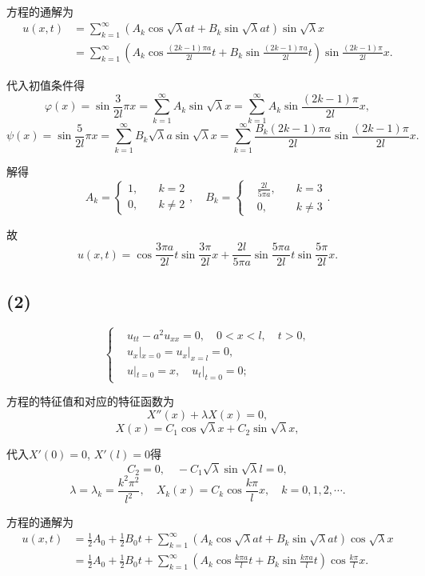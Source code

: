 \documentclass[11pt,a4paper]{article}
\begin{document}
方程的通解为
\begin{align*}
  u(x,t)
   & =\sum_{k=1}^\infty\left(A_k\cos\sqrt{\lambda}at+
  B_k\sin\sqrt{\lambda}at\right)\sin\sqrt{\lambda}x          \\
   & =\sum_{k=1}^\infty\left(A_k\cos\frac{(2k-1)\pi a}{2l}t+
  B_k\sin\frac{(2k-1)\pi a}{2l}t\right)\sin\frac{(2k-1)\pi}{2l}x.
\end{align*}

代入初值条件得
$$\varphi(x)=\sin\frac{3}{2l}\pi x=\sum_{k=1}^\infty A_k\sin\sqrt{\lambda}x=\sum_{k=1}^\infty A_k\sin\frac{(2k-1)\pi }{2l}x,$$
$$\psi(x)=\sin\frac{5}{2l}\pi x=\sum_{k=1}^\infty B_k\sqrt{\lambda}a\sin\sqrt{\lambda}x=\sum_{k=1}^\infty \frac{B_k(2k-1)\pi a}{2l}\sin\frac{(2k-1)\pi}{2l}x.$$

解得
$$A_k=\left\{\begin{aligned}1, &\quad k = 2 \\ 0, &\quad k\neq 2 \end{aligned}\right.,\quad B_k=\left\{\begin{aligned}&\frac{2l}{5\pi a}, &\quad k = 3 \\ &0, &\quad k\neq 3 \end{aligned}\right..$$

故
$$u(x,t)=\cos\frac{3\pi a}{2l}t\sin\frac{3\pi}{2l}x+
  \frac{2l}{5\pi a}\sin\frac{5\pi a}{2l}t\sin\frac{5\pi}{2l}x.$$

\subsection*{(2)}

$$
  \left\{\begin{aligned}
     & u_{tt}-a^2u_{xx}=0, \quad 0<x<l,\quad t>0, \\
     & u_x|_{x=0}=u_x|_{x=l}=0,                   \\
     & u|_{t=0}=x,\quad u_t|_{t=0}=0;
  \end{aligned}\right.
$$

方程的特征值和对应的特征函数为
$$X''(x)+\lambda X(x)=0,$$
$$X(x)=C_1\cos\sqrt{\lambda}x+C_2\sin\sqrt{\lambda}x,$$

代入$X'(0)=0$, $X'(l)=0$得
$$C_2=0,\quad -C_1\sqrt{\lambda}\sin\sqrt{\lambda}l=0,$$
$$\lambda=\lambda_k=\frac{k^2\pi^2}{l^2},\quad X_k(x)=C_k\cos\frac{k\pi}{l}x,\quad k=0,1,2,\cdots.$$

方程的通解为
\begin{align*}
  u(x,t)
   & =\frac{1}{2}A_0+\frac{1}{2}B_0t+
  \sum_{k=1}^\infty\left(A_k\cos\sqrt{\lambda}at+
  B_k\sin\sqrt{\lambda}at\right)\cos\sqrt{\lambda}x \\
   & =\frac{1}{2}A_0+\frac{1}{2}B_0t+
  \sum_{k=1}^\infty\left(A_k\cos\frac{k\pi a}{l}t+
  B_k\sin\frac{k\pi a}{l}t\right)\cos\frac{k\pi}{l}x.
\end{align*}
\end{document}
